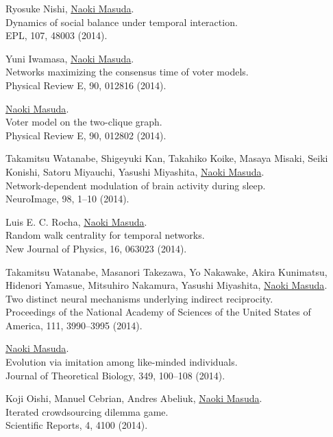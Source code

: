\documentclass[11pt,letter]{article}
\begin{document}
\begin{etaremune}
\item Ryosuke Nishi, \underline{Naoki Masuda}.\\
Dynamics of social balance under temporal interaction.\\
EPL, 107, 48003 (2014).

\item Yuni Iwamasa, \underline{Naoki Masuda}.\\
Networks maximizing the consensus time of voter models.\\
Physical Review E, 90, 012816 (2014).

\item \underline{Naoki Masuda}.\\
Voter model on the two-clique graph.\\
Physical Review E, 90, 012802 (2014).

\item Takamitsu Watanabe, Shigeyuki Kan, Takahiko Koike, Masaya Misaki, Seiki Konishi, Satoru Miyauchi, Yasushi Miyashita, \underline{Naoki Masuda}.\\
Network-dependent modulation of brain activity during sleep.\\
NeuroImage, 98, 1--10 (2014).

\item Luis E. C. Rocha, \underline{Naoki Masuda}.\\
Random walk centrality for temporal networks.\\
New Journal of Physics, 16, 063023 (2014).

\item Takamitsu Watanabe, Masanori Takezawa, Yo Nakawake, Akira Kunimatsu, Hidenori Yamasue, Mitsuhiro Nakamura, Yasushi Miyashita, \underline{Naoki Masuda}.\\
Two distinct neural mechanisms underlying indirect reciprocity.\\
Proceedings of the National Academy of Sciences of the United States of America, 111, 3990--3995 (2014).

\item \underline{Naoki Masuda}.\\
Evolution via imitation among like-minded individuals.\\
Journal of Theoretical Biology, 349, 100--108 (2014).

\item Koji Oishi, Manuel Cebrian, Andres Abeliuk, \underline{Naoki Masuda}.\\
Iterated crowdsourcing dilemma game.\\
Scientific Reports, 4, 4100 (2014).


\end{etaremune}
\end{document}
